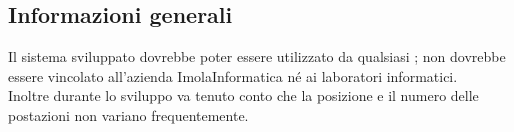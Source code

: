 \subsection*{Informazioni generali}
Il sistema sviluppato dovrebbe poter essere utilizzato da qualsiasi ; non dovrebbe essere vincolato all'azienda ImolaInformatica né ai laboratori informatici.\\
Inoltre durante lo sviluppo va tenuto conto che la posizione e il numero delle postazioni non variano frequentemente. 
